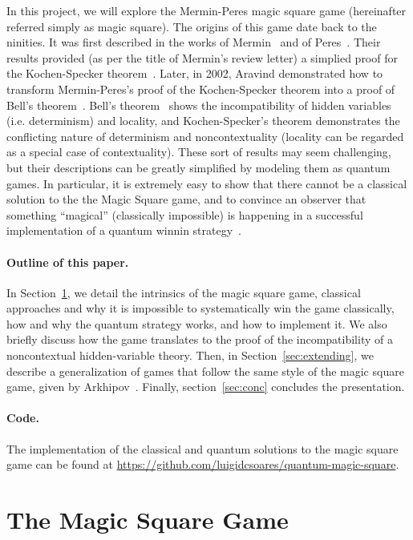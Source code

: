 \documentclass{llncs}
\begin{document}
In this project, we will explore the Mermin-Peres magic square game
(hereinafter referred simply as magic square). The origins of this
game date back to the ninities. It was first described in the works of
Mermin~\cite{mermin:1990, mermin:1993} and of
Peres~\cite{peres:1990, peres:1997}. Their results provided (as per the title of
Mermin's review letter) a simplied proof for the Kochen-Specker
theorem~\cite{kochen:1967}. Later, in 2002, Aravind demonstrated how
to transform Mermin-Peres's proof of the Kochen-Specker theorem into a
proof of Bell's theorem~\cite{aravind:2002}. Bell's
theorem~\cite{bell:1964} shows the incompatibility of hidden variables
(i.e. determinism) and locality, and Kochen-Specker's theorem
demonstrates the conflicting nature of determinism and
noncontextuality (locality can be regarded as a special case of
contextuality). These sort of results may seem
challenging, but their descriptions can be greatly simplified by
modeling them as quantum games.  In particular, it is extremely easy
to show that there cannot be a classical solution to the the Magic
Square game, and to convince an observer that something ``magical''
(classically impossible) is happening in a successful implementation
of a quantum winnin strategy~\cite{brassard:2005}.

\paragraph{Outline of this paper.}
In Section~\ref{sec:magic-square}, we detail the intrinsics of the
magic square game, classical approaches and why it is impossible to
systematically win the game classically, how and why the quantum
strategy works, and how to implement it. We also briefly discuss how
the game translates to the proof of the incompatibility of a
noncontextual hidden-variable theory. Then, in
Section~\ref{sec:extending}, we describe a generalization of games
that follow the same style of the magic square game, given
by Arkhipov~\cite{arkhipov:2012}. Finally, section~\ref{sec:conc} concludes the
presentation.

\paragraph{Code.} The implementation of the classical and quantum
solutions to the magic square game can be found at
\url{https://github.com/luigidcsoares/quantum-magic-square}.

\section{The Magic Square Game}
\label{sec:magic-square}
\end{document}
